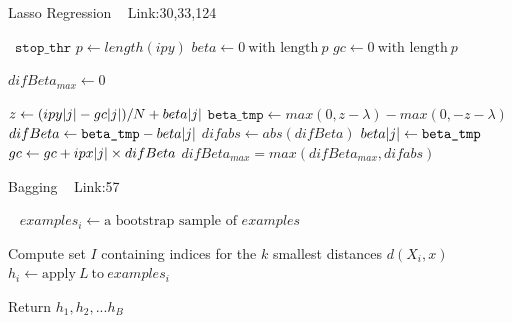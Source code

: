 \documentclass[a4paper]{article}
\begin{document}
 \begin{algorithm}
 
   \caption{Lasso Regression ~\cite{lasso1} Link:30,33,124}
    \begin{algorithmic}[1]
      \
      \State $\texttt{stop\_thr}$ 
      \State $p \leftarrow length(ipy)$
      \State $beta \leftarrow 0 \ \text{with length} \ p$
\State $gc \leftarrow 0 \ \text{with length} \ p$
 
 \State $difBeta_{max} \leftarrow  0 $
 
 \State $z \leftarrow (ipy\abs{j} - gc\abs{j})/N +beta\abs{j}$
 \State $\texttt{beta\_tmp} \leftarrow max(0,z-\lambda)- max(0,-z-\lambda) $
 \State $difBeta \leftarrow \texttt{beta\_tmp}  - beta\abs{j}$
 \State $difabs \leftarrow abs(difBeta)$
  \State $beta\abs{j} \leftarrow \texttt{beta\_tmp} $ 
  \State $gc \leftarrow gc + ipx\abs{j} \times difBeta$
  \State $difBeta_{max} = max(difBeta_{max},difabs)$
  \EndIf
 \EndFor
\EndWhile


 \EndFunction

\end{algorithmic}
\end{algorithm}


  \begin{algorithm}
 
   \caption{Bagging ~\cite{bagging1 } Link:57}
    \begin{algorithmic}[1]
      \
            \State $examples_{i} \leftarrow \text{a bootstrap sample of }  examples$
        \EndFor
        
         \State Compute set $I$ containing indices for the $k$ smallest distances $d{(X_i,x)}$
         \State $h_i  \leftarrow \text{apply}\  L \ \text{to} \  examples_{i}$
     
       \State Return $h_{1},h_{2},...h_{B}$



 \EndFunction
 
 \end{algorithmic}
\end{algorithm}
\end{document}

